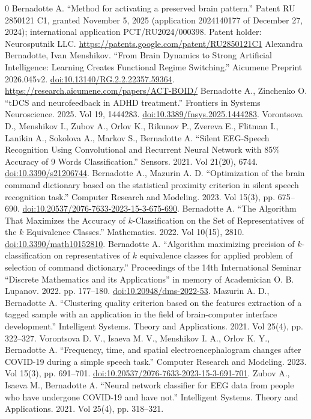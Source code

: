 \documentclass{article}
\begin{document}
\begin{thebibliography}{0}
 Bernadotte A. ``Method for activating a preserved brain pattern.'' Patent RU 2850121 C1, granted November 5, 2025 (application 2024140177 of December 27, 2024); international application PCT/RU2024/000398. Patent holder: Neurosputnik LLC. \url{https://patents.google.com/patent/RU2850121C1}
 Alexandra Bernadotte, Ivan Menshikov. ``From Brain Dynamics to Strong Artificial Intelligence: Learning Creates Functional Regime Switching.'' Aicumene Preprint 2026.045v2. \href{https://doi.org/10.13140/RG.2.2.22357.59364}{doi:10.13140/RG.2.2.22357.59364}. \url{https://research.aicumene.com/papers/ACT-BOID/}
 Bernadotte A., Zinchenko O. ``tDCS and neurofeedback in ADHD treatment.'' Frontiers in Systems Neuroscience. 2025. Vol 19, 1444283. \href{https://doi.org/10.3389/fnsys.2025.1444283}{doi:10.3389/fnsys.2025.1444283}.
 Vorontsova D., Menshikov I., Zubov A., Orlov K., Rikunov P., Zvereva E., Flitman I., Lanikin A., Sokolova A., Markov S., Bernadotte A. ``Silent EEG-Speech Recognition Using Convolutional and Recurrent Neural Network with 85\% Accuracy of 9 Words Classification.'' Sensors. 2021. Vol 21(20), 6744. \href{https://doi.org/10.3390/s21206744}{doi:10.3390/s21206744}.
 Bernadotte A., Mazurin A. D. ``Optimization of the brain command dictionary based on the statistical proximity criterion in silent speech recognition task.'' Computer Research and Modeling. 2023. Vol 15(3), pp. 675--690. \href{https://doi.org/10.20537/2076-7633-2023-15-3-675-690}{doi:10.20537/2076-7633-2023-15-3-675-690}.
 Bernadotte A. ``The Algorithm That Maximizes the Accuracy of $k$-Classification on the Set of Representatives of the $k$ Equivalence Classes.'' Mathematics. 2022. Vol 10(15), 2810. \href{https://doi.org/10.3390/math10152810}{doi:10.3390/math10152810}.
 Bernadotte A. ``Algorithm maximizing precision of $k$-classification on representatives of $k$ equivalence classes for applied problem of selection of command dictionary.'' Proceedings of the 14th International Seminar ``Discrete Mathematics and its Applications'' in memory of Academician O. B. Lupanov. 2022. pp. 177--180. \href{https://doi.org/10.20948/dms-2022-53}{doi:10.20948/dms-2022-53}.
 Mazurin A. D., Bernadotte A. ``Clustering quality criterion based on the features extraction of a tagged sample with an application in the field of brain-computer interface development.'' Intelligent Systems. Theory and Applications. 2021. Vol 25(4), pp. 322--327.
 Vorontsova D. V., Isaeva M. V., Menshikov I. A., Orlov K. Y., Bernadotte A. ``Frequency, time, and spatial electroencephalogram changes after COVID-19 during a simple speech task.'' Computer Research and Modeling. 2023. Vol 15(3), pp. 691--701. \href{https://doi.org/10.20537/2076-7633-2023-15-3-691-701}{doi:10.20537/2076-7633-2023-15-3-691-701}.
 Zubov A., Isaeva M., Bernadotte A. ``Neural network classifier for EEG data from people who have undergone COVID-19 and have not.'' Intelligent Systems. Theory and Applications. 2021. Vol 25(4), pp. 318--321.

\end{thebibliography}
\end{document}
